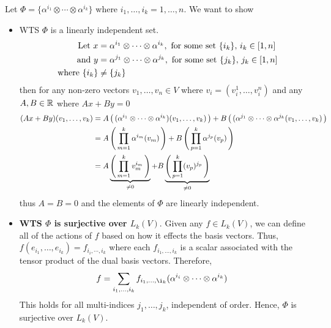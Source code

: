 \documentclass[10pt,a4paper]{report}
\begin{document}
\begin{enumerate}[label=3.\arabic*.]
	Let $\Phi = \{\alpha^{i_1}\otimes \cdots \otimes \alpha^{i_k}\}$ where $i_1, \dots, i_k = 1, \dots, n$.  We want to show
	\begin{itemize}
		\item WTS $\Phi$ is a linearly independent set.
		\begin{align*}
			\text{Let } x &= \alpha^{i_1}\otimes \cdots \otimes \alpha^{i_k}, \text{ for some set } \{i_k\},\, i_k\in [1,n] \\
			\text{ and } y &= \alpha^{j_1}\otimes \cdots \otimes \alpha^{j_k}, \text{ for some set } \{j_k\},\, j_k\in [1,n] \\
			\text{ where } \{i_k\} &\ne \{j_k\}
		\end{align*}then for any non-zero vectors $v_1, \dots, v_n \in V$ where $v_i=(v_i^1,\dots, v_i^n)$ and any $A, B \in \mathbb{R}$ where $Ax +By = 0$
		\begin{align*}
			(Ax+By)(v_1,\dots,v_k) &= A\left (\, (\alpha^{i_1}\otimes \cdots \otimes \alpha^{i_k})(v_1,\dots,v_k) \,\right ) + B\left (\, (\alpha^{j_1}\otimes \cdots \otimes \alpha^{j_k}(v_1,\dots,v_k) \,\right ) \\
			&= A\left (\, \prod_{m=1}^k\alpha^{i_m}(v_m) \,\right )+B\left (\, \prod_{p=1}^k\alpha^{j_p}(v_p) \,\right )\\
			&= A\underbrace{\left (\, \prod_{m=1}^kv_m^{i_m} \,\right )}_{\ne 0}+B\underbrace{\left (\, \prod_{p=1}^k(v_p)^{j_p} \,\right )}_{\ne 0}
		\end{align*}thus $A = B = 0$ and the elements of $\Phi$ are linearly independent.\\ 
		\item \textbf{WTS $\Phi$ is surjective over $L_k(V)$}. Given any $f \in L_k(V)$, we can define all of the actions of $f$ based on how it effects the basis vectors.  Thus, $f(e_{i_1},\dots,e_{i_k}) = f_{i_i,\cdots,i_k}$ where each $f_{i_1,\dots,i_k}$ is a scalar associated with the tensor product of the dual basis vectors.  Therefore, 
		\begin{align*}
			f &= \sum_{i_1,\dots,i_k} f_{i_1,\dots,\i_k}(\alpha^{i_i}\otimes\cdots\otimes\alpha^{i_k})
		\end{align*}	
This holds for all multi-indices $j_1,\dots,j_k$, independent of order. Hence, $\Phi$ is surjective over $L_k(V)$.\\
	\end{itemize}

\end{enumerate}
\end{document}

